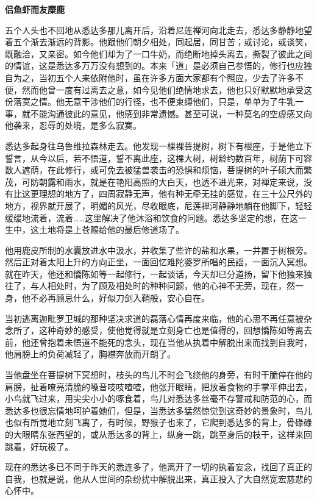 \documentclass[twoside,openany]{book}
\newcommand{\mt}[1]{\textbullet \textbf{#1}}
\begin{document}
\mt{侣鱼虾而友糜鹿}

五个人头也不回地从悉达多那儿离开后，沿着尼莲禅河向北走去，悉达多静静地望着五个渐去渐远的背影。他跟他们朝夕相处，同起居，同甘苦；或讨论，或谈笑，既融洽，又亲密。如今他们却为了一口牛奶，而绝断地掉头离去，撕裂了彼此之间的情谊，这是悉达多万万没有想到的。本来「道」是必须自己参悟的，修行也应独自为之，当初五个人来依附他时，虽在许多方面大家都有个照应，少去了许多不便，然而他曾一度有过离去之意，如今见他们绝情地求去，他也只好默默地承受这份落寞之情。他无意干涉他们的行径，也不便束缚他们，只是，单单为了牛乳一事，就不能沟通彼此的意见，他感到非常遗憾。甚至可说，一种莫名的空虚感又向他袭来，忍辱的处境，是多么寂寞。

悉达多起身往乌鲁维拉森林走去。他发现一棵裸菩提树，树下有根座，于是他立下誓言，从今以后，若不悟道，誓不离此座，这棵大树，树龄约数百年，树荫下可容数人遮荫，在此修行，或可免去被猛兽袭击的恐惧和烦恼，菩提树的叶子硕大而繁茂，可防朝露和雨水，就是在艳阳高照的大白天，也透不进光来，对禅定来说，没有比这更理想的地方了，四周寂静无声，他有种无牵无挂的感觉，在三十公尺外的地方，视界就开展了，明媚的风光，尽收眼底，尼莲禅河静静地躺在他脚下，轻轻缓缓地流着，流着……这里解决了他沐浴和饮食的问题。悉达多坚定的想，在这一生中，这土地将是上苍赐给他的最后修道场了。

他用鹿皮所制的水囊放进水中汲水，并收集了些许的盐和水果，一并置于树根旁。然后正对着太阳上升的方向正坐，一面回忆难陀婆罗所唱的民謡，一面沉入冥想。就在昨天，他还和憍陈如等一起修行，一起谈话，今天却已分道扬，留下他独来独往了，与人相处时，为了顾及相处时的种种问题，他的心神不无旁，现在，然一身，他不必再顾忌什么，好似刀剑入鞘般，安心自在。

当初逃离迦毗罗卫城的那种坚决求道的磊落心情再度来临，他的心思不再任意被杂念所了，这种奇妙的感受，使他觉得就是立刻身亡也是值得的，回想憍陈如等离去前，他还曾抱着未悟道不能死的念头，现在当他从执着中解脱出来而找到自我时，他肩膀上的负荷减轻了，胸襟奔放而开朗了。

当他盘坐在菩提树下冥想时，枝头的鸟儿不时会飞绕他的身旁，有时干脆停在他的肩膀，扯着嘹亮清脆的嗓音吱吱喳喳，他张开眼睛，把放着食物的手掌平伸出去，小鸟就飞过来，用尖尖小小的啄食着，鸟儿对悉达多丝毫不存警戒和防范的心，而悉达多也很忘情地呵护着她们，但是，当悉达多猛然惊觉到这奇妙的景象时，鸟儿也似有所觉地立刻飞离了，有时候，野猴子也来了，它爬到悉达多的背上，骨碌碌的大眼睛东张西望的，或从悉达多的背上，纵身一跳，跳至身后的枝干，这样来回跳着，好玩极了。

现在的悉达多已不同于昨天的悉连多了，他离开了一切的执着妄念，找回了真正的自我，也就是说，他从人世间的杂纷扰中解脱出来，真正投入了大自然宽宏慈悲的心怀中。
\end{document}
